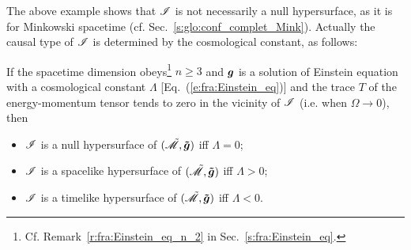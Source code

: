 The above example shows that $\mathscr{I}$ is not necessarily a null hypersurface,
as it is for Minkowski spacetime (cf. Sec.~\ref{s:glo:conf_complet_Mink}).
Actually the causal type of $\mathscr{I}$ is determined by the cosmological
constant, as follows:
\begin{prop}
\label{p:glo:type_scri_sign_Lambda}
If the spacetime dimension obeys\footnote{Cf. Remark~\ref{r:fra:Einstein_eq_n_2} in
Sec.~\ref{s:fra:Einstein_eq}.}
$n\geq 3$ and $\bm{g}$ is a solution of Einstein equation with
a cosmological constant $\Lambda$ [Eq.~(\ref{e:fra:Einstein_eq})]
and the trace $T$ of the energy-momentum tensor tends to zero in the
vicinity of $\mathscr{I}$ (i.e. when $\Omega\rightarrow 0$), then
\begin{itemize}
\item $\mathscr{I}$ is a null hypersurface of $(\tilde{\mathscr{M}},\bm{\tilde{g}})$ iff $\Lambda=0$;
\item $\mathscr{I}$ is a spacelike hypersurface of $(\tilde{\mathscr{M}},\bm{\tilde{g}})$ iff $\Lambda>0$;
\item $\mathscr{I}$ is a timelike hypersurface of $(\tilde{\mathscr{M}},\bm{\tilde{g}})$ iff $\Lambda<0$.
\end{itemize}
\end{prop}
